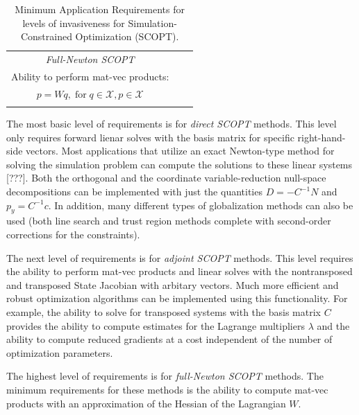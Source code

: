 \documentclass[pdf,ps2pdf,11pt]{SANDreport}
\begin{document}
{\begin{table}
{\begin{center}
\begin{tabular}{|c|c|l|}
\begin{minipage}{70ex}
\end{minipage} \\
\hline
{}\textit{Full-Newton SCOPT}
& \begin{minipage}{70ex}
\hspace{0in}\\
Ability to perform mat-vec products:\\
$p = W q, \; \mbox{for} \; q \in \mathcal{X}, p \in \mathcal{X}$ \\
\end{minipage} \\
\hline
\end{tabular}
\end{center}}
\caption[Minimum Application Requirements for levels of invasiveness
 for Simulation-Constrained Optimization (SCOPT)]{
\label{moocho:tbl:SCOPT_requirements}
Minimum Application Requirements for levels of invasiveness for
Simulation-Constrained Optimization (SCOPT).  }
\end{table}
\esinglespace}

The most basic level of requirements is for \textit{direct SCOPT} methods.
This level only requires forward lienar solves with the basis matrix for
specific right-hand-side vectors.  Most applications that utilize an exact
Newton-type method for solving the simulation problem can compute the
solutions to these linear systems [???].  Both the orthogonal and the
coordinate variable-reduction null-space decompositions can be implemented
with just the quantities $D = -C^{-1} N$ and $p_y = C^{-1} c$.  In addition,
many different types of globalization methods can also be used (both line
search and trust region methods complete with second-order corrections for the
constraints).

The next level of requirements is for \textit{adjoint SCOPT} methods.  This
level requires the ability to perform mat-vec products and linear solves with
the nontransposed and transposed State Jacobian with arbitary vectors.  Much
more efficient and robust optimization algorithms can be implemented using
this functionality.  For example, the ability to solve for transposed systems
with the basis matrix $C$ provides the ability to compute estimates for the
Lagrange multipliers $\lambda$ and the ability to compute reduced gradients at
a cost independent of the number of optimization parameters.

The highest level of requirements is for \textit{full-Newton SCOPT}
methods.  The minimum requirements for these methods is the ability
to compute mat-vec products with an approximation of the Hessian
of the Lagrangian $W$.
\end{document}
